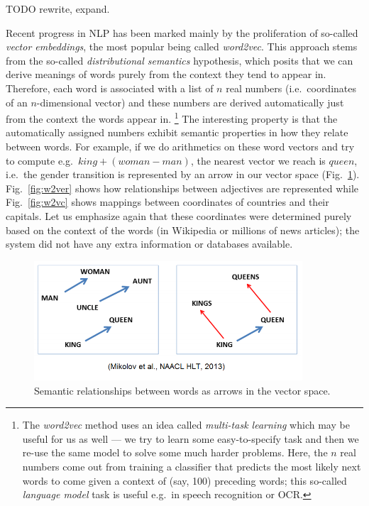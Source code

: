 TODO rewrite, expand.

Recent progress in NLP has been marked mainly by the proliferation of
so-called \textit{vector embeddings}, the most popular being called
\textit{word2vec}.  This approach stems from the so-called \textit{distributional semantics}
hypothesis, which posits that we can derive meanings of words purely
from the context they tend to appear in.  Therefore, each word is
associated with a list of $n$ real numbers (i.e.\ coordinates of
an $n$-dimensional vector) and these numbers are derived automatically
just from the context the words appear in.%
\footnote{The \textit{word2vec} method uses an idea called \textit{multi-task learning}
	which may be useful for us as well --- we try to learn
	some easy-to-specify task and then we re-use the same model to
	solve some much harder problems.  Here, the $n$ real numbers
	come out from training a classifier that predicts the most likely
	next words to come given a context of (say, 100) preceding words;
	this so-called \textit{language model} task is useful e.g.\ in
	speech recognition or OCR.}
The interesting property is that the automatically assigned numbers
exhibit semantic properties in how they relate between words.
For example, if we do arithmetics on these word vectors and try
to compute e.g.\ $king + (woman - man)$, the nearest vector we reach
is $queen$, i.e.\ the gender transition is represented by an arrow
in our vector space (Fig.~\ref{fig:w2vg}).
Fig.~\ref{fig:w2ver} shows how relationships between adjectives are represented
while Fig.~\ref{fig:w2vc} shows mappings between coordinates of countries
and their capitals.  Let us emphasize again that these coordinates were
determined purely based on the context of the words (in Wikipedia or
millions of news articles); the system did not have any extra information
or databases available.

\begin{figure}[ht]
	\centering
	\includegraphics[width=10cm]{kingqueen.png}
	\caption{Semantic relationships between words as arrows in the vector space. \cite{WordVecLingReg}}
	\label{fig:w2vg}
\end{figure}

